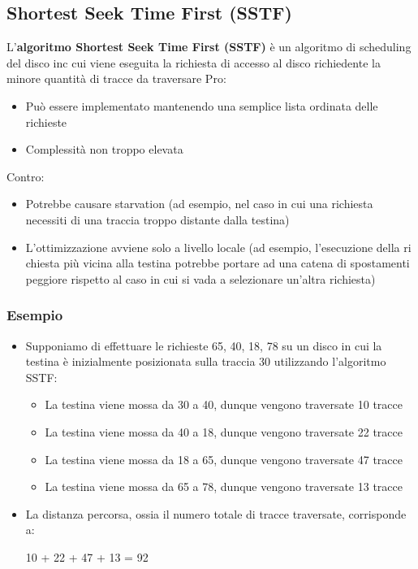 \documentclass{article}
\begin{document}
\subsection{Shortest Seek Time First (SSTF)}
L'\textbf{algoritmo Shortest Seek Time First (SSTF)} è un algoritmo di scheduling del disco inc cui viene eseguita la richiesta di accesso al disco richiedente la minore quantità di tracce da traversare
Pro:
\begin{itemize}
    \item Può essere implementato mantenendo una semplice lista ordinata delle richieste
    \item Complessità non troppo elevata
\end{itemize}
Contro:
\begin{itemize}
    \item Potrebbe causare starvation (ad esempio, nel caso in cui una richiesta necessiti di una traccia troppo distante dalla testina)
    \item L'ottimizzazione avviene solo a livello locale (ad esempio, l'esecuzione della ri chiesta più vicina alla testina potrebbe portare ad una catena di spostamenti peggiore rispetto al caso in cui si vada a selezionare un'altra richiesta)
\end{itemize}


\subsubsection{Esempio}
\begin{itemize}
    \item Supponiamo di effettuare le richieste 65, 40, 18, 78 su un disco in cui la testina è inizialmente posizionata sulla traccia 30 utilizzando l'algoritmo SSTF:
    \begin{itemize}
        \item La testina viene mossa da 30 a 40, dunque vengono traversate 10 tracce 
        \item La testina viene mossa da 40 a 18, dunque vengono traversate 22 tracce 
        \item La testina viene mossa da 18 a 65, dunque vengono traversate 47 tracce 
        \item La testina viene mossa da 65 a 78, dunque vengono traversate 13 tracce
    \end{itemize}
    \item La distanza percorsa, ossia il numero totale di tracce traversate, corrisponde a:
    \begin{center}
        10 + 22 + 47 + 13 = 92
    \end{center}
\end{itemize}
\pagebreak
\end{document}
